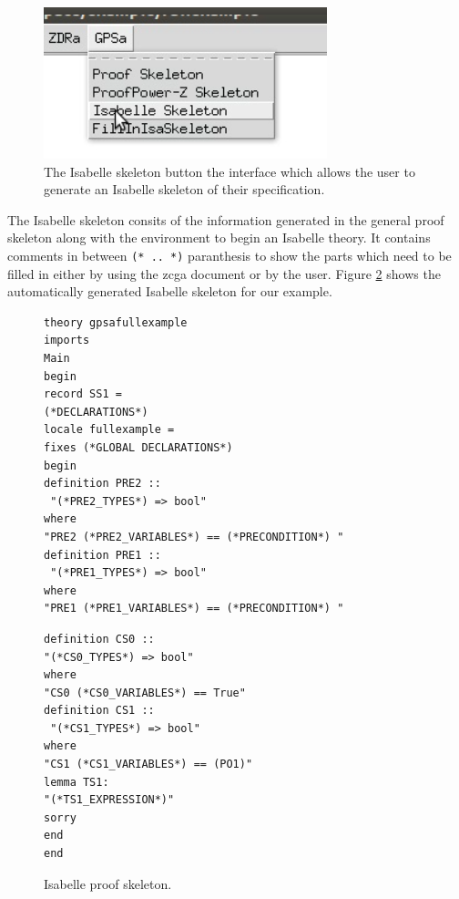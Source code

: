 \begin{figure}[H]
\centering
\includegraphics[scale=0.45]{Figures/fullexample/isabelskeleton.png}
\caption{The Isabelle skeleton button the interface which allows the user to generate an Isabelle skeleton of their specification. \label{fig:isabutton}}
\end{figure}

 The Isabelle skeleton consits of the information generated in the general proof skeleton along with the environment to begin an Isabelle theory. It contains comments in between \verb|(* .. *)| paranthesis to show the parts which need to be filled in either by using the \gls{zcga} document or by the user. Figure \ref{fig:isaFullexample} shows the automatically generated Isabelle skeleton for our example.

\begin{figure}[H]
\centering
\begin{minipage}{0.45\textwidth}
\centering
\begin{scriptsize}
\begin{BVerbatim}
theory gpsafullexample
imports 
Main 
begin 
record SS1 = 
(*DECLARATIONS*)
locale fullexample = 
fixes (*GLOBAL DECLARATIONS*) 
begin
definition PRE2 :: 
 "(*PRE2_TYPES*) => bool"
where 
"PRE2 (*PRE2_VARIABLES*) == (*PRECONDITION*) "
definition PRE1 :: 
 "(*PRE1_TYPES*) => bool"
where 
"PRE1 (*PRE1_VARIABLES*) == (*PRECONDITION*) "
\end{BVerbatim}
\end{scriptsize}
\end{minipage}\hfill
\begin{minipage}{0.45\textwidth}
\begin{scriptsize}
\begin{BVerbatim}
definition CS0 :: 
"(*CS0_TYPES*) => bool"
where 
"CS0 (*CS0_VARIABLES*) == True"
definition CS1 :: 
 "(*CS1_TYPES*) => bool"
where 
"CS1 (*CS1_VARIABLES*) == (PO1)"
lemma TS1: 
"(*TS1_EXPRESSION*)"
sorry
end
end
\end{BVerbatim}
\end{scriptsize}
\end{minipage}
\caption{Isabelle proof skeleton. \label{fig:isaFullexample}}
\end{figure}

